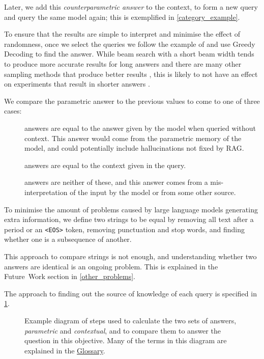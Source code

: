 Later, we add this \emph{counterparametric answer} to the context, to form a new query and query the same model again; this is exemplified in \cref{category_example}.

To ensure that the results are simple to interpret and minimise the effect of randomness, once we select the queries we follow the example of \citeauthor{ragged} and use Greedy Decoding to find the answer.
While beam search with a short beam width tends to produce more accurate results for long answers \citep{sutskever_seq2seqlearning,wu_mltranslation} and there are many other sampling methods that produce better results \citep{text_degeneration}, this is likely to not have an effect on experiments that result in shorter answers \citep{t5}.

We compare the parametric answer to the previous values to come to one of three cases:
\begin{description}
	\item[\Parametric{}] answers are equal to the answer given by the model when queried without context.
		This answer would come from the parametric memory of the model, and could potentially include hallucinations not fixed by RAG.
	\item[\Contextual{}] answers are equal to the context given in the query.
	\item[\Other] answers are neither of these, and this answer comes from a mis-interpretation of the input by the model or from some other source.
\end{description}

To minimise the amount of problems caused by large language models generating extra information, we define two strings to be equal by removing all text after a period or an \texttt{<EOS>} token, removing punctuation and stop words, and finding whether one is a subsequence of another.

This approach to compare strings is not enough, and understanding whether two answers are identical is an ongoing problem.
This is explained in the Future~Work section in \cref{other_problems}.

The approach to finding out the source of knowledge of each query is specified in \cref{action_diagram}.

\begin{figure}[tb]
	\centering
	\caption{Example diagram of steps used to calculate the two sets of answers, \textit{parametric} and \textit{contextual}, and to compare them to answer the question in this objective. Many of the terms in this diagram are explained in the \protect\hyperref[glossary]{Glossary}.}
	\label{action_diagram}
\end{figure}

